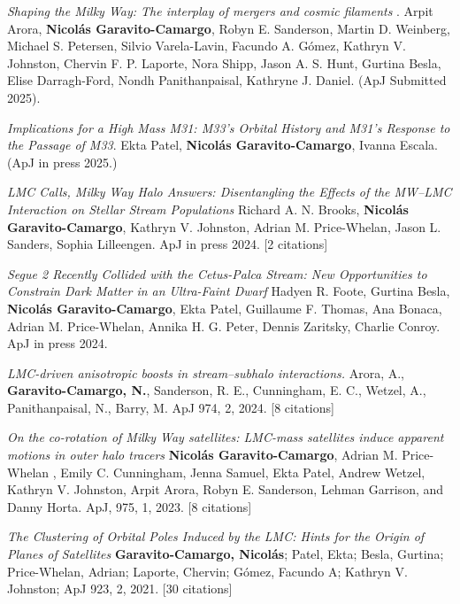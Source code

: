 \documentclass[14pt]{article}
\begin{document}
\begin{etaremune}
  \setcounter{enumi}{34}
\item \dag \textit{Shaping the Milky Way: The interplay of mergers and cosmic
  filaments }.
  Arpit Arora, \textbf{Nicol\'as
  Garavito-Camargo},  Robyn E. Sanderson, Martin D. Weinberg, Michael S. Petersen, Silvio Varela-Lavin, Facundo A. Gómez, Kathryn V. Johnston, Chervin F. P. Laporte, Nora Shipp, Jason A. S. Hunt, Gurtina Besla, Elise Darragh-Ford, Nondh Panithanpaisal, Kathryne J. Daniel. (ApJ Submitted 2025).

\item \textit{Implications for a High Mass M31: M33’s Orbital History and M31’s
  Response to the Passage of M33}. Ekta Patel, \textbf{Nicol\'as
  Garavito-Camargo}, Ivanna Escala. (ApJ in press 2025.)

\item \dag \textit{LMC Calls, Milky Way Halo Answers: Disentangling the Effects of
  the MW--LMC Interaction on Stellar Stream Populations}  Richard A. N.
  Brooks, \textbf{Nicol\'as Garavito-Camargo}, Kathryn V. Johnston, Adrian M. Price-Whelan,
  Jason L. Sanders, Sophia Lilleengen. ApJ in press 2024. [2 citations]

\item \ddag \textit{Segue 2 Recently Collided with the Cetus-Palca Stream: New
    Opportunities to Constrain Dark Matter in an Ultra-Faint Dwarf} Hadyen R.
    Foote, Gurtina Besla, \textbf{Nicol\'as Garavito-Camargo}, Ekta Patel, Guillaume F.
    Thomas, Ana Bonaca, Adrian M. Price-Whelan, Annika H. G. Peter, Dennis
    Zaritsky, Charlie Conroy. ApJ in press 2024. 

\item \dag \textit{LMC-driven anisotropic boosts in stream–subhalo
  interactions.} Arora, A., \textbf{Garavito-Camargo, N.}, Sanderson, R. E.,
  Cunningham, E. C., Wetzel, A., Panithanpaisal, N., Barry, M. ApJ 974, 2, 2024.
  [8 citations]

\item \textit{On the co-rotation of Milky Way satellites: LMC-mass satellites induce apparent motions in outer halo tracers}  
  \textbf{Nicol\'as Garavito-Camargo}, Adrian M. Price-Whelan , Emily C. Cunningham, Jenna
Samuel, Ekta Patel, Andrew Wetzel, Kathryn V. Johnston, Arpit Arora, Robyn E.
Sanderson, Lehman Garrison, and Danny Horta. ApJ, 975, 1, 2023. [8 citations] 

\item \textit{The Clustering of Orbital Poles Induced by the LMC: Hints for
      the Origin of Planes of Satellites}
      \textbf{Garavito-Camargo, Nicol\'as}; Patel, Ekta; Besla, Gurtina; Price-Whelan,
      Adrian; Laporte, Chervin; G\'omez, Facundo A; Kathryn V. Johnston; ApJ
      923, 2, 2021. [30 citations]


\end{etaremune}
\end{document}
